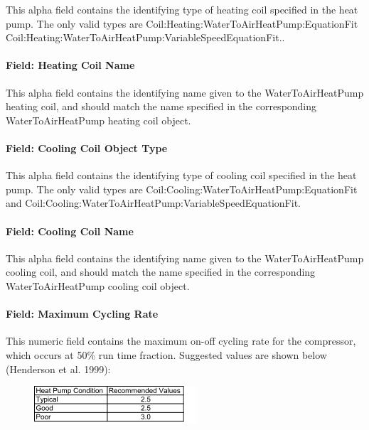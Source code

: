 This alpha field contains the identifying type of heating coil specified in the heat pump. The only valid types are Coil:Heating:WaterToAirHeatPump:EquationFit Coil:Heating:WaterToAirHeatPump:VariableSpeedEquationFit..

\paragraph{Field: Heating Coil Name}\label{field-heating-coil-name-5-000}

This alpha field contains the identifying name given to the WaterToAirHeatPump heating coil, and should match the name specified in the corresponding WaterToAirHeatPump heating coil object.

\paragraph{Field: Cooling Coil Object Type}\label{field-cooling-coil-object-type-5-000}

This alpha field contains the identifying type of cooling coil specified in the heat pump. The only valid types are Coil:Cooling:WaterToAirHeatPump:EquationFit and Coil:Cooling:WaterToAirHeatPump:VariableSpeedEquationFit.

\paragraph{Field: Cooling Coil Name}\label{field-cooling-coil-name-4-000}

This alpha field contains the identifying name given to the WaterToAirHeatPump cooling coil, and should match the name specified in the corresponding WaterToAirHeatPump cooling coil object.

\paragraph{Field: Maximum Cycling Rate}\label{field-maximum-cycling-rate-002}

This numeric field contains the maximum on-off cycling rate for the compressor, which occurs at 50\% run time fraction. Suggested values are shown below (Henderson et al. 1999):

\begin{figure}[htbp]
\centering
\includegraphics{media/image289.png}
\caption{}
\end{figure}

